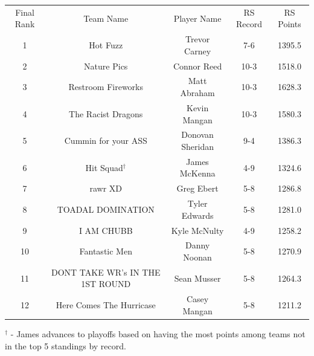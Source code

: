 \documentclass[11pt,letterpaper]{article}
\begin{document}
\newpage
{}
\vspace{-25pt}
\begin{table} [h]
\begin{center}
\begin{tabular} { c c c c c }
\\ Final Rank & Team Name & Player Name & RS Record & RS Points
\\ 1 & Hot Fuzz & Trevor Carney & 7-6 & 1395.5
\\ 2 & Nature Pics & Connor Reed & 10-3 & 1518.0
\\ 3 & Restroom Fireworks & Matt Abraham & 10-3 & 1628.3
\\ 4 & The Racist Dragons & Kevin Mangan & 10-3 & 1580.3
\\ 5 & Cummin for your ASS & Donovan Sheridan & 9-4 & 1386.3
\\ 6 & Hit Squad$^\dag$ & James McKenna & 4-9 & 1324.6
\\ 7 & rawr XD & Greg Ebert & 5-8 & 1286.8
\\ 8 & TOADAL DOMINATION & Tyler Edwards & 5-8 & 1281.0
\\ 9 & I AM CHUBB & Kyle McNulty & 4-9 & 1258.2
\\ 10 & Fantastic Men & Danny Noonan & 5-8 & 1270.9
\\ 11 & DONT TAKE WR's IN THE 1ST ROUND & Sean Musser & 5-8 & 1264.3
\\ 12 & Here Comes The Hurricase & Casey Mangan & 5-8 & 1211.2
\end{tabular}
\end{center}
\noindent$^\dag$ - James advances to playoffs based on having the most points among teams not in the top 5 standings by record.
\end{table}
\end{document}
